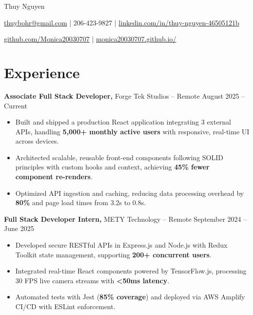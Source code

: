 \documentclass[11pt]{article}       %
\begin{document}
\centerline{\Huge Thuy Nguyen}

\vspace{5pt}

\centerline{\href{mailto:thuybohr@gmail.com}{thuybohr@gmail.com} | 206-423-9827 |
\href{https://www.linkedin.com/in/thuy-nguyen-46505121b/}{linkedin.com/in/thuy-nguyen-46505121b}}

\centerline{\href{https://github.com/Monica20030707}{github.com/Monica20030707} | 
\href{https://monica20030707.github.io/monica20030707.github.io}{monica20030707.github.io/}}

\vspace{-9pt}

\section*{Experience}

\textbf{Associate Full Stack Developer,} {Forge Tek Studios} -- Remote \hfill August 2025 -- Current \\
\vspace{-9pt}
\begin{itemize}
  \item Built and shipped a production React application integrating 3 external APIs, handling \textbf{5,000+ monthly active users} with responsive, real-time UI across devices.
  \item Architected scalable, reusable front-end components following SOLID principles with custom hooks and context, achieving \textbf{45\% fewer component re-renders}.
  \item Optimized API ingestion and caching, reducing data processing overhead by \textbf{80\%} and page load times from 3.2s to 0.8s.
\end{itemize}

\textbf{Full Stack Developer Intern,} {METY Technology} -- Remote \hfill September 2024 -- June 2025 \\
\vspace{-9pt}
\begin{itemize}
  \item Developed secure RESTful APIs in Express.js and Node.js with Redux Toolkit state management, supporting \textbf{200+ concurrent users}.
  \item Integrated real-time React components powered by TensorFlow.js, processing 30 FPS live camera streams with \textbf{<50ms latency}.
  \item Automated tests with Jest (\textbf{85\% coverage}) and deployed via AWS Amplify CI/CD with ESLint enforcement.
\end{itemize}
\end{document}
